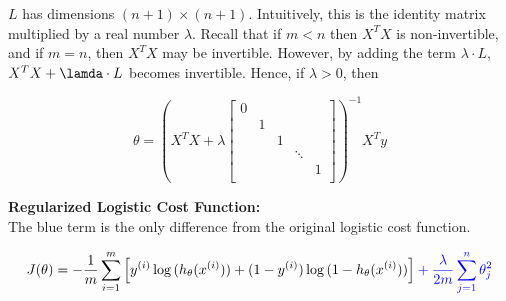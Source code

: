 \pagebreak
\noindent $L$ has dimensions $(n+1)\times(n+1)$. Intuitively, this is the identity matrix multiplied
by a real number $\lambda$. Recall that if $m<n$ then $X^T X$ is non-invertible, and if $m=n$, then
$X^T X$ may be invertible. However, by adding the term $\lambda\cdot L$, $X^T X+\lamda\cdot L$ becomes
invertible. Hence, if $\lambda>0$, then

\begin{equation*}
    \theta=\left(X^T X +\lambda
    \begin{bmatrix} 0 & & & & \\ & 1 & & & \\ & & 1 & & \\ & & & \ddots & \\
    & & & & 1 \\ \end{bmatrix}\right)^{-1} X^T y
\end{equation*}

\noindent \textbf{Regularized Logistic Cost Function:} \\
The blue term is the only difference from the original logistic cost function.

\begin{equation*}
    J(\theta) = -\frac{1}{m}\sum^m_{i=1}\left[y^{(i)}\log{(h_\theta(x^{(i)}))}
    + (1-y^{(i)})\log{(1-h_\theta(x^{(i)}))}\right]
    \color{blue} + \frac{\lambda}{2m}\sum^n_{j=1} \theta^2_j \color{black}
\end{equation*}